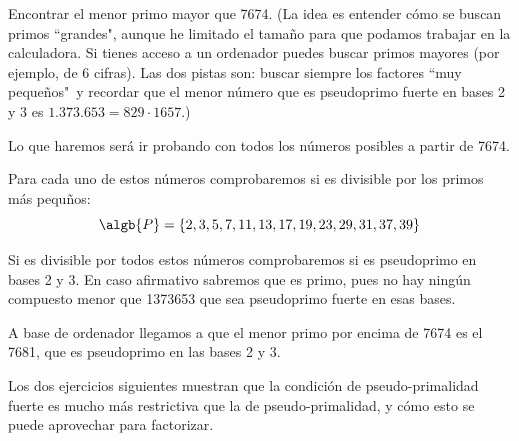 \begin{problem}[16]
Encontrar el menor primo mayor que 7674. (La idea es entender
cómo se buscan primos ``grandes", aunque he limitado el tamaño
para que podamos trabajar en la calculadora. Si tienes acceso a un
ordenador puedes buscar primos mayores (por ejemplo, de 6 cifras).
Las dos pistas son: buscar siempre los factores ``muy pequeños"\ y
recordar que el menor número que es pseudoprimo fuerte en bases 2
y 3 es $1.373.653=829\cdot1657$.)
\solution


Lo que haremos será ir probando con todos los números posibles a partir de 7674.

Para cada uno de estos números comprobaremos si es divisible por los primos más pequños:
\[\algb{P} = \{2,3,5,7,11,13,17,19,23,29,31,37,39\}\]

Si es divisible por todos estos números comprobaremos si es pseudoprimo en bases 2 y 3. En caso afirmativo sabremos que es primo, pues no hay ningún compuesto menor que 1373653 que sea pseudoprimo fuerte en esas bases.

A base de ordenador llegamos a que el menor primo por encima de 7674 es el 7681, que es pseudoprimo en las bases 2 y 3.

\end{problem}

\vspace{2mm}

  Los dos ejercicios siguientes muestran que la
condición de pseudo-primalidad fuerte es mucho más restrictiva
que la de pseudo-primalidad, y cómo esto se puede aprovechar para
factorizar.

\vspace{2mm}

